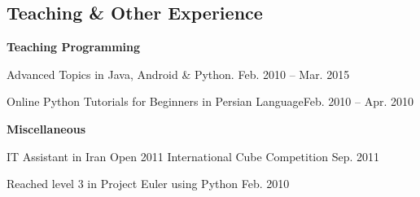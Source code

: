 \documentclass[margin,line]{resume}
\begin{document}
\begin{resume}
    \section{\mysidestyle Teaching \& Other Experience}

    {\bf Teaching Programming} 
    \begin{list2}
        \vspace*{1mm}
        \item Advanced Topics in Java, Android \& Python. \hfill {\sf Feb. 2010 -- Mar. 2015}
        \item Online Python Tutorials for Beginners in Persian Language\hfill {\sf Feb. 2010 -- Apr. 2010}
    \end{list2}
     {\bf Miscellaneous} 
    \begin{list2}
        \vspace*{1mm}
		\item IT Assistant in Iran Open 2011 International Cube Competition \hfill {\sf Sep. 2011}
		\item Reached level 3 in Project Euler using Python \hfill {\sf Feb. 2010}
    \end{list2}


\end{resume}
\end{document}
